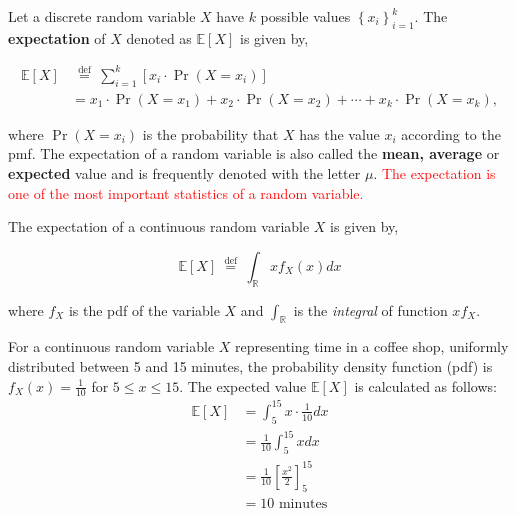 \documentclass[9pt,dvipsnames]{beamer}
\begin{document}
\begin{frame}
	Let a discrete random variable $X$ have $k$ possible values $\left\{x_{i}\right\}_{i=1}^{k}$. The \textbf{expectation} of $X$ denoted as $\mathbb{E}[X]$ is given by,

	$$
		\begin{aligned}
			\mathbb{E}[X] & \stackrel{\text { def }}{=} \sum_{i=1}^{k}\left[x_{i} \cdot \operatorname{Pr}\left(X=x_{i}\right)\right]                                                       \\
			              & =x_{1} \cdot \operatorname{Pr}\left(X=x_{1}\right)+x_{2} \cdot \operatorname{Pr}\left(X=x_{2}\right)+\cdots+x_{k} \cdot \operatorname{Pr}\left(X=x_{k}\right),
		\end{aligned}
	$$

	where $\operatorname{Pr}\left(X=x_{i}\right)$ is the probability that $X$ has the value $x_{i}$ according to the pmf. The expectation of a random variable is also called the \textbf{mean, average} or \textbf{expected} value and is frequently denoted with the letter $\mu$. \textcolor{red}{The expectation is one of the most important statistics of a random variable.}
\end{frame}

\begin{frame}
	The expectation of a continuous random variable $X$ is given by,

	$$
		\mathbb{E}[X] \stackrel{\text { def }}{=} \int_{\mathbb{R}} x f_{X}(x) d x
	$$

	where $f_{X}$ is the pdf of the variable $X$ and $\int_{\mathbb{R}}$ is the \textit{integral} of function $x f_{X}$.
	\begin{tcolorbox}[enhanced jigsaw, breakable, pad at break*=1mm, colback=gray!20!white, colframe=black!85!black, title=\textbf{Expectation for Continuous Random Variable}]
		\small
		For a continuous random variable \( X \) representing time in a coffee shop, uniformly distributed between 5 and 15 minutes, the probability density function (pdf) is \( f_X(x) = \frac{1}{10} \) for \( 5 \leq x \leq 15 \). The expected value \( \mathbb{E}[X] \) is calculated as follows:
		\begin{align*}
			\mathbb{E}[X] & = \int_{5}^{15} x \cdot \frac{1}{10} dx              \\
			              & = \frac{1}{10} \int_{5}^{15} x dx                    \\
			              & = \frac{1}{10} \left[ \frac{x^2}{2} \right]_{5}^{15} \\
			              & = 10 \text{ minutes}
		\end{align*}
	\end{tcolorbox}
\end{frame}
\end{document}
